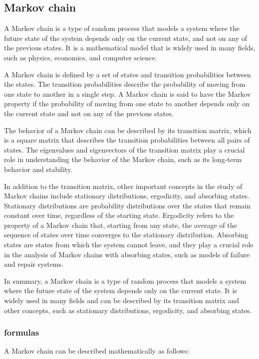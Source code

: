 \documentclass[12pt, a4paper, oneside]{article}
\begin{document}
\subsection{ Markov chain }
A Markov chain is a type of random process that models a system where the future state of the system depends only on the current state, and not on any of the previous states. It is a mathematical model that is widely used in many fields, such as physics, economics, and computer science.

A Markov chain is defined by a set of states and transition probabilities between the states. The transition probabilities describe the probability of moving from one state to another in a single step. A Markov chain is said to have the Markov property if the probability of moving from one state to another depends only on the current state and not on any of the previous states.

The behavior of a Markov chain can be described by its transition matrix, which is a square matrix that describes the transition probabilities between all pairs of states. The eigenvalues and eigenvectors of the transition matrix play a crucial role in understanding the behavior of the Markov chain, such as its long-term behavior and stability.

In addition to the transition matrix, other important concepts in the study of Markov chains include stationary distributions, ergodicity, and absorbing states. Stationary distributions are probability distributions over the states that remain constant over time, regardless of the starting state. Ergodicity refers to the property of a Markov chain that, starting from any state, the average of the sequence of states over time converges to the stationary distribution. Absorbing states are states from which the system cannot leave, and they play a crucial role in the analysis of Markov chains with absorbing states, such as models of failure and repair systems.

In summary, a Markov chain is a type of random process that models a system where the future state of the system depends only on the current state. It is widely used in many fields and can be described by its transition matrix and other concepts, such as stationary distributions, ergodicity, and absorbing states.
\subsubsection{formulas}
A Markov chain can be described mathematically as follows:
\end{document}
